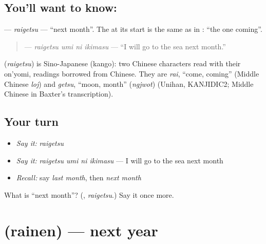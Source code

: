 \subsection*{You'll want to know: }
\textbf{} — \emph{raigetsu} — \textquotedblleft{}next month\textquotedblright{}. The \textbf{} at its start is the same as in \textbf{}: \textquotedblleft{}the one coming\textquotedblright{}.

\begin{quote}
\textbf{  } — \emph{raigetsu umi ni ikimasu} — \textquotedblleft{}I will go to the sea next month.\textquotedblright{}
\end{quote}

\begin{cousinweb}
\textbf{} (\emph{raigetsu}) is Sino-Japanese (kango): two Chinese characters read with their on'yomi, readings borrowed from Chinese. They are \emph{rai}, \textquotedblleft{}come, coming\textquotedblright{} (Middle Chinese \emph{loj}) and \emph{getsu}, \textquotedblleft{}moon, month\textquotedblright{} (\emph{ngjwot}) (Unihan, KANJIDIC2; Middle Chinese in Baxter's transcription).
\end{cousinweb}

\subsection*{Your turn}
\begin{itemize}
\raggedright
  \item \emph{Say it:} \emph{raigetsu}
  \item \emph{Say it:} \emph{raigetsu umi ni ikimasu} — I will go to the sea next month
  \item \emph{Recall:} say \emph{last month}, then \emph{next month}
\end{itemize}

\begin{tcolorbox}[breakable,colback=teal!4,colframe=teal!35!black,title={Before you move on}]
What is \textquotedblleft{}next month\textquotedblright{}? (\textbf{}, \emph{raigetsu}.) Say it once more.
\end{tcolorbox}
\section[\texorpdfstring{\ja{らいねん} (rainen)}{らいねん (rainen)}]{ (rainen) — next year}

